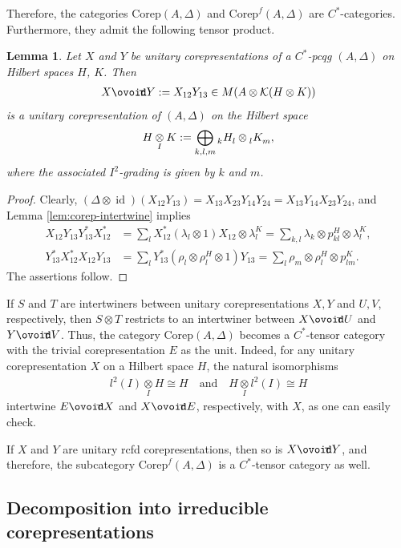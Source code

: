 \documentclass[11pt]{article}
\newcommand{\Corep}{\mathrm{Corep}}
\newcommand{\Corepf}{\mathrm{Corep}^{f}}
\DeclareMathOperator{\id}{id}
\newcommand{\Circt}{{\mathop{\ooalign{$\ovoid$\cr\hidewidth\raise-.05ex\hbox{$\scriptstyle\mathsf T\mkern3.5mu$}\cr}}}} %
\newcommand{\itimes}{\underset{I}{\otimes}}
\newcommand{\Gr}[5]{\tensor*[^{#2}_{#4}]{#1}{^{#3}_{#5}}}%
\newcommand{\Grd}[3]{\Gr{#1}{}{}{#2}{#3}}
\newtheorem{Lem}[Theorem]{Lemma}
\theoremstyle{definition}
\numberwithin{equation}{section}
\begin{document}
Therefore, the categories $\Corep(A,\Delta)$ and $\Corepf(A,\Delta)$ are
$C^{*}$-categories. Furthermore, they admit the following tensor product.
\begin{Lem}
  Let $X$ and $Y$ be unitary corepresentations of a $C^{*}$-pcqg $(A,\Delta)$ on Hilbert spaces $H$,
  $K$. Then
    \begin{align*}
      X \Circt Y:= X_{12}Y_{13} \in M(A \otimes \mathcal{K}(H \otimes K))
    \end{align*}
    is a unitary corepresentation of $(A,\Delta)$ on the Hilbert space
    \begin{align*}
      H \itimes K := \bigoplus_{k,l,m} \Grd{H}{k}{l} \otimes \Grd{K}{l}{m},
    \end{align*}
    where the  associated $I^{2}$-grading is given by  $k$ and $m$.
\end{Lem}
\begin{proof}
Clearly,
$(\Delta \otimes \id)(X_{12}Y_{13}) = X_{13}X_{23}Y_{14}Y_{24} =
    X_{13}Y_{14}X_{23}Y_{24}$,
and Lemma \ref{lem:corep-intertwine} implies
\begin{align*}
  X_{12}Y_{13}Y_{13}^{*}X_{12}^{*} &= \sum_{l} X_{12}^{*}(\lambda_{l}
  \otimes 1)X_{12} \otimes \lambda_{l}^{K} = \sum_{k,l} \lambda_{k}
  \otimes p_{kl}^{H} \otimes \lambda_{l}^{K}, \\
  Y_{13}^{*}X_{12}^{*}X_{12}Y_{13} &= \sum_{l} Y_{13}^{*}(\rho_{l}
  \otimes \rho_{l}^{H}\otimes 1)Y_{13}  = \sum_{l} \rho_{m} \otimes
  \rho_{l}^{H} \otimes p_{lm}^{K}. 
\end{align*}
The assertions follow. 
\end{proof}
If $S$ and $T$ are intertwiners between unitary corepresentations $X,Y$ and $U,V$, respectively,
then $S\otimes T$ restricts to an intertwiner between $X\Circt U$ and $Y\Circt V$.  
Thus, the category $\Corep(A,\Delta)$ becomes a $C^{*}$-tensor category with the trivial corepresentation $E$ as the unit. 
Indeed, for any unitary corepresentation $X$ on a Hilbert space $H$, the natural isomorphisms
\begin{align*}
  l^{2}(I) \itimes H \cong H  \quad \text{and} \quad H \itimes l^{2}(I)\cong H
\end{align*}
intertwine $E \Circt X$ and $X\Circt E$, respectively, with $X$, as one can easily check.

If $X$ and $Y$ are unitary rcfd corepresentations, then so is $X\Circt Y$, and therefore,  the subcategory
$\Corepf(A,\Delta)$ is a $C^{*}$-tensor category as well.


\subsection{Decomposition into irreducible corepresentations}
\end{document}
